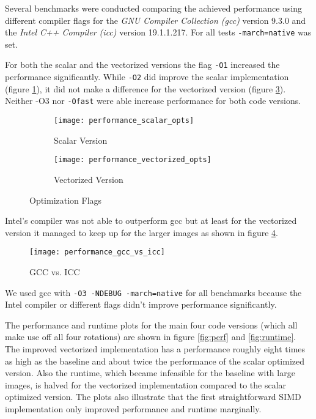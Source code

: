  Several benchmarks were conducted comparing the achieved
performance using different compiler flags for the \textit{GNU Compiler
  Collection (gcc)} version 9.3.0 and the \textit{Intel C++ Compiler (icc)}
version 19.1.1.217. For all tests \texttt{-march=native} was set.

For both the scalar and the vectorized versions the flag \texttt{-O1} increased
the performance significantly. While \texttt{-O2} did improve the scalar
implementation (figure \ref{fig:perf_scal}), it did not make a difference for
the vectorized version (figure \ref{fig:perf_vec}). Neither \textsc{-O3} nor
\texttt{-Ofast} were able increase performance for both code versions.

\begin{figure}[H]
  \begin{subfigure}[t]{\linewidth}
    \centering
    \texttt{[image: performance\_scalar\_opts]}
    \caption{Scalar Version}
    \label{fig:perf_scal}
  \end{subfigure}
  \begin{subfigure}[b]{\linewidth}
    \centering
    \texttt{[image: performance\_vectorized\_opts]}
    \caption{Vectorized Version}
    \label{fig:perf_vec}
  \end{subfigure}
  \caption{Optimization Flags}
\end{figure}


Intel's compiler was not able to outperform gcc but at least for the vectorized
version it managed to keep up for the larger images as shown in figure
\ref{fig:perf_gcc_vs_icc}.

\begin{figure}[H]
  \centering
  \texttt{[image: performance\_gcc\_vs\_icc]}
  \caption{GCC vs. ICC}
  \label{fig:perf_gcc_vs_icc}
\end{figure}

We used gcc with \verb|-O3 -NDEBUG -march=native| for all benchmarks because the
Intel compiler or different flags didn't improve performance significantly.

 The performance and runtime plots for the main four code
versions (which all make use off all four rotations) are shown in figure
\ref{fig:perf} and \ref{fig:runtime}. The improved vectorized implementation has
a performance roughly eight times as high as the baseline and about twice the
performance of the scalar optimized version. Also the runtime, which became
infeasible for the baseline with large images, is halved for the vectorized
implementation compared to the scalar optimized version. The plots also
illustrate that the first straightforward SIMD implementation only improved
performance and runtime marginally.


